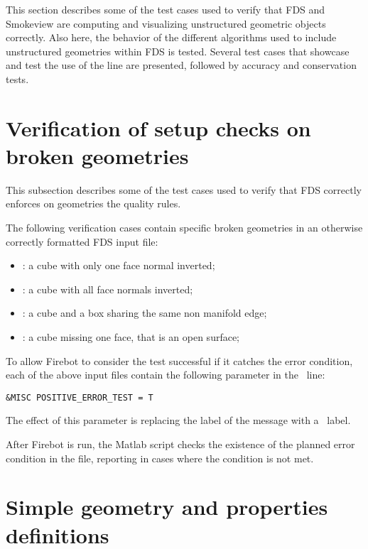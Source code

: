 \documentclass[11pt]{book}
\begin{document}
This section describes some of the test cases used to verify that FDS and Smokeview are computing
and visualizing unstructured geometric objects correctly. Also here, the behavior of the different
algorithms used to include unstructured geometries within FDS is tested. Several test cases that showcase
and test the use of the  line are presented, followed by accuracy and conservation tests.


\section{Verification of setup checks on broken geometries}

This subsection describes some of the test cases used to verify that FDS correctly enforces on geometries
the quality rules.

The following verification cases contain specific broken geometries in an otherwise correctly
formatted FDS input file:

\begin{itemize}
  \item {}: a cube with only one face normal inverted;
  \item {}: a cube with all face normals inverted;
  \item {}: a cube and a box sharing the same non manifold edge;
  \item {}: a cube missing one face, that is an open surface;
\end{itemize}

To allow Firebot to consider the test successful if it catches the error condition,
each of the above input files contain the following parameter in the \ line:

\begin{lstlisting}
&MISC POSITIVE_ERROR_TEST = T
\end{lstlisting}

The effect of this parameter is replacing the  label of the message with a \ label.

After Firebot is run, the  Matlab script checks the existence
of the planned error condition in the  file, reporting in cases where the condition
is not met.


\newpage

\section{Simple geometry and properties definitions}
\end{document}
